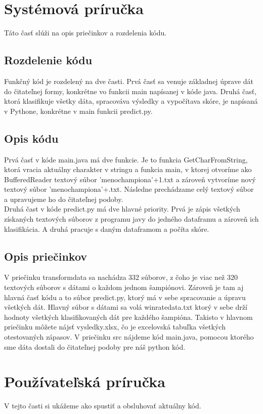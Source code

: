 
\chapter{Systémová príručka}
Táto časť slúži na opis priečinkov a rozdelenia kódu.
\section*{Rozdelenie kódu}
Funkčný kód je rozdelený na dve časti. Prvá časť sa venuje základnej úprave dát do čitateľnej formy, konkrétne vo funkcii main napísanej v kóde java. Druhá časť, ktorá klasifikuje všetky dáta, spracováva výsledky a vypočítava skóre, je napísaná v Pythone, konkrétne v main funkcii predict.py. 
\section*{Opis kódu}
Prvá časť v kóde main.java má dve funkcie. Je to funkcia GetCharFromString, ktorá vracia aktuálny charakter v stringu a funkcia main, v ktorej otvoríme ako BufferedReader textový súbor 'menochampiona'+1.txt a zároveň vytvoríme nový textový súbor 'menochampiona'+.txt. Následne prechádzame celý textový súbor a upravujeme ho do čitateľnej podoby.
\\ Druhá čast v kóde predict.py má dve hlavné priority. Prvá je zápis všetkých získaných textových súborov z programu javy do jedného dataframu a zároveň ich klasifikácia. A druhá pracuje s daným dataframom a počíta skóre.
\section*{Opis priečinkov}
V priečinku transformdata sa nachádza 332 súborov, z čoho je viac než 320 textových súborov s dátami o každom jednom šampiónovi. Zároveň je tam aj hlavná časť kódu a to súbor predict.py, ktorý má v sebe spracovanie a úpravu všetkých dát. Hlavný súbor s dátami sa volá winratedata.txt ktorý v sebe drží hodnoty všetkých klasifikovaných dát pre každého šampióna. Takisto v hlavnom priečinku môžete nájsť vysledky.xlsx, čo je excelovská tabuľka všetkých otestovaných zápasov. V priečinku src nájdeme kód main.java, pomocou ktorého sme dáta dostali do čitateľnej podoby pre náš python kód. 

\chapter{Používateľská príručka}
V tejto časti si ukážeme ako spustiť a obsluhovať aktuálny kód.

